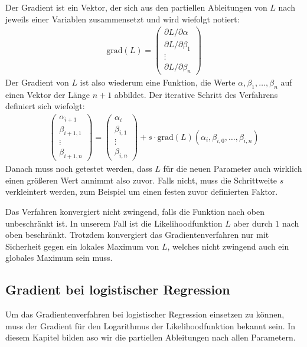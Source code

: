 Der Gradient ist ein Vektor, der sich aus den partiellen Ableitungen von $L$ nach jeweils einer Variablen zusammensetzt und wird wiefolgt notiert:
\begin{align*}
    \text{grad}(L) = \begin{pmatrix}
        \partial L / \partial \alpha \\
        \partial L / \partial \beta_1 \\
        \vdots \\
        \partial L / \partial \beta_n
    \end{pmatrix}
\end{align*}
Der Gradient von $L$ ist also wiederum eine Funktion, die Werte $\alpha, \beta_1, \dots, \beta_n$ auf einen Vektor der Länge $n+1$ abbildet. Der iterative Schritt des Verfahrens definiert sich wiefolgt:
\begin{align*}
    \begin{pmatrix}
        \alpha_{i + 1} \\
        \beta_{i + 1, 1} \\
        \vdots \\
        \beta_{i + 1, n}
    \end{pmatrix} = \begin{pmatrix}
        \alpha_i \\
        \beta_{i, 1} \\
        \vdots \\
        \beta_{i, n}
    \end{pmatrix} + s \cdot \text{grad}(L) (\alpha_i, \beta_{i, 0}, \dots, \beta_{i, n})
\end{align*}
Danach muss noch getestet werden, dass $L$ für die neuen Parameter auch wirklich einen größeren Wert annimmt also zuvor. Falls nicht, muss die Schrittweite $s$ verkleintert werden, zum Beispiel um einen festen zuvor definierten Faktor.

Das Verfahren konvergiert nicht zwingend, falls die Funktion nach oben unbeschränkt ist. In unserem Fall ist die Likelihoodfunktion $L$ aber durch $1$ nach oben beschränkt. Trotzdem konvergiert das Gradientenverfahren nur mit Sicherheit gegen ein lokales Maximum von $L$, welches nicht zwingend auch ein globales Maximum sein muss.

\subsection{Gradient bei logistischer Regression}

Um das Gradientenverfahren bei logistischer Regression einsetzen zu können, muss der Gradient für den Logarithmus der Likelihoodfunktion bekannt sein. In diesem Kapitel bilden aso wir die partiellen Ableitungen nach allen Parametern.

